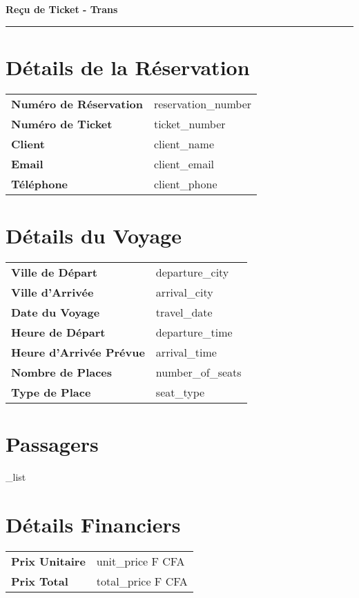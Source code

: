 \documentclass[a4paper,12pt]{article}
\begin{document}
\begin{center}
    {\Large \textbf{Reçu de Ticket - Trans}} \\
    \vspace{0.2cm}
    {\color{headercolor}\rule{\textwidth}{2pt}}
\end{center}

\section*{Détails de la Réservation}
\begin{tabular}{ll}
    \textbf{Numéro de Réservation} & reservation_number \\
    \textbf{Numéro de Ticket} & ticket_number \\
    \textbf{Client} & client_name \\
    \textbf{Email} & client_email \\
    \textbf{Téléphone} & client_phone \\
\end{tabular}

\section*{Détails du Voyage}
\begin{tabular}{ll}
    \textbf{Ville de Départ} & departure_city \\
    \textbf{Ville d'Arrivée} & arrival_city \\
    \textbf{Date du Voyage} & travel_date \\
    \textbf{Heure de Départ} & departure_time \\
    \textbf{Heure d'Arrivée Prévue} & arrival_time \\
    \textbf{Nombre de Places} & number_of_seats \\
    \textbf{Type de Place} & seat_type \\
\end{tabular}

\section*{Passagers}
\begin{itemize}
    \passenger_list
\end{itemize}

\section*{Détails Financiers}
\begin{tabular}{ll}
    \textbf{Prix Unitaire} & unit_price F CFA \\
    \textbf{Prix Total} & total_price F CFA \\
\end{tabular}
\end{document}
